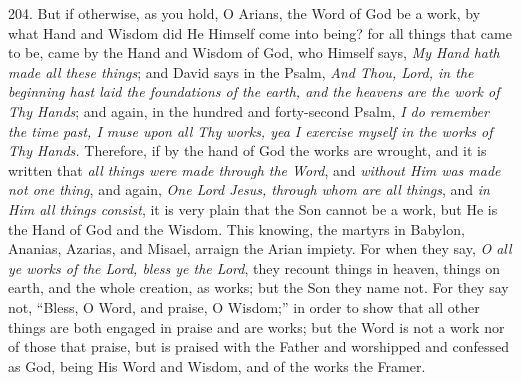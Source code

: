 204. But if otherwise, as you
hold, O Arians, the Word of God be a work, by what Hand and Wisdom did
He Himself come into being? for all things that came to be, came by
the Hand and Wisdom of God, who Himself says, \emph{My Hand hath made all
these things}; and David says in the Psalm, \emph{And Thou, Lord, in
the beginning hast laid the foundations of the earth, and the heavens
are the work of Thy Hands}; and again, in the hundred and
forty-second Psalm, \emph{I do remember the time past, I muse upon all
Thy works, yea I exercise myself in the works of Thy Hands.}
Therefore, if by the hand of God the works are wrought, and it is
written that \emph{all things were made through the Word}, and \emph{without
Him was made not one thing}, and again, \emph{One Lord Jesus, through
whom are all things}, and \emph{in Him all things consist}, it is
very plain that the Son cannot be a work, but He is the Hand of God
and the Wisdom. This knowing, the martyrs in Babylon, Ananias, Azarias,
and Misael, arraign the Arian impiety. For when they say, \emph{O all ye
works of the Lord, bless ye the Lord}, they recount things in
heaven, things on earth, and the whole creation, as works; but the Son
they name not. For they say not, ``Bless, O Word, and praise, O Wisdom;''
in order to show that all other things are both engaged in praise and
are works; but the Word is not a work nor of those that praise, but is
praised with the Father and worshipped and confessed as God, being His
Word and Wisdom, and of the works the Framer.

